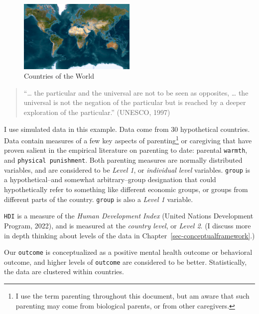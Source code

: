 \documentclass[
  letterpaper,
  DIV=11,
  numbers=noendperiod]{scrreprt}
\begin{document}
\begin{figure}

{\centering \includegraphics[width=0.5\textwidth,height=\textheight]{./world.png}

}

\caption{\label{fig-world}Countries of the World}

\end{figure}

\begin{quote}
``\ldots{} the particular and the universal are not to be seen as
opposites, \ldots{} the universal is not the negation of the particular
but is reached by a deeper exploration of the particular.'' (UNESCO,
1997)
\end{quote}

I use simulated data in this example. Data come from 30 hypothetical
countries. Data contain measures of a few key aspects of
parenting\footnote{I use the term parenting throughout this document,
  but am aware that such parenting may come from biological parents, or
  from other caregivers.} or caregiving that have proven salient in the
empirical literature on parenting to date: parental \texttt{warmth}, and
\texttt{physical\ punishment}. Both parenting measures are normally
distributed variables, and are considered to be \emph{Level 1}, or
\emph{individual level} variables. \texttt{group} is a hypothetical--and
somewhat arbitrary--group designation that could hypothetically refer to
something like different economic groups, or groups from different parts
of the country. \texttt{group} is also a \emph{Level 1} variable.

\texttt{HDI} is a measure of the \emph{Human Development Index} (United
Nations Development Program, 2022), and is measured at the \emph{country
level}, or \emph{Level 2}. (I discuss more in depth thinking about
levels of the data in Chapter~\ref{sec-conceptualframework}.)

Our \texttt{outcome} is conceptualized as a positive mental health
outcome or behavioral outcome, and higher levels of \texttt{outcome} are
considered to be better. Statistically, the data are clustered within
countries.
\end{document}
